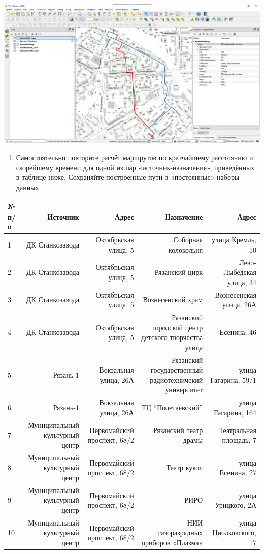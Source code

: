 \documentclass[
  12pt,
]{book}
\providecommand{\tightlist}{%
  \setlength{\itemsep}{0pt}\setlength{\parskip}{0pt}}
\begin{document}
\includegraphics{images/Ex11_RoadNetwork/shortest_vs_fastest.png}

\begin{enumerate}
\def\labelenumi{\arabic{enumi}.}
\setcounter{enumi}{17}
\tightlist
\item
  Самостоятельно повторите расчёт маршрутов по кратчайшему расстоянию и скорейшему времени для одной из пар «источник-назначение», приведённых в таблице ниже. Сохраняйте построенные пути в «постоянные» наборы данных.
\end{enumerate}

\begin{longtable}[]{@{}lrrrr@{}}
\toprule
№ п/п & Источник & Адрес & Назначение & Адрес \\
\midrule
\endhead
1 & ДК Станкозавода & Октябрьская улица, 5 & Соборная колокольня & улица Кремль, 10 \\
2 & ДК Станкозавода & Октябрьская улица, 5 & Рязанский цирк & Лево-Лыбедская улица, 34 \\
3 & ДК Станкозавода & Октябрьская улица, 5 & Вознесенский храм & Вознесенская улица, 26А \\
4 & ДК Станкозавода & Октябрьская улица, 5 & Рязанский городской центр детского творчества улица & Есенина, 46 \\
5 & Рязань-1 & Вокзальная улица, 26А & Рязанский государственный радиотехничекий университет & улица Гагарина, 59/1 \\
6 & Рязань-1 & Вокзальная улица, 26А & ТЦ ``Полетаевский'' & улица Гагарина, 164 \\
7 & Муниципальный культурный центр & Первомайский проспект, 68/2 & Рязанский театр драмы & Театральная площадь, 7 \\
8 & Муниципальный культурный центр & Первомайский проспект, 68/2 & Театр кукол & улица Есенина, 27 \\
9 & Муниципальный культурный центр & Первомайский проспект, 68/2 & РИРО & улица Урицкого, 2А \\
10 & Муниципальный культурный центр & Первомайский проспект, 68/2 & НИИ газоразрядных приборов «Плазма» & улица Циолковского, 17 \\
\bottomrule
\end{longtable}
\end{document}
